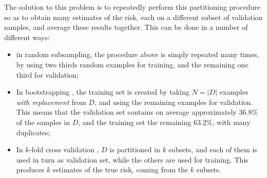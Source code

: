 \documentclass[a4paper]{book}
\begin{document}
The solution to this problem is to repeatedly perform this partitioning procedure so as to obtain many estimates of the risk, each on a different subset of validation samples, and average these results together. This can be done in a number of different ways:

\begin{itemize}
\item in random subsampling, the procedure above is simply repeated many times, by using two thirds random examples for training, and the remaining one third for validation;
\item In bootstrapping \citep{bootstrap}, the training set is created by taking $N=\vert D\vert$ examples \emph{with replacement} from $D$, and using the remaining examples for validation. This means that the validation set contains on average approximately 36.8\% of the samples in $D$, and the training set the remaining 63.2\%, with many duplicates;
\item In $k$-fold cross validation \citep{kfold}, $D$ is partitioned in $k$ subsets, and each of them is used in turn as validation set, while the others are used for training. This produces $k$ estimates of the true risk, coming from the $k$ subsets.
\end{itemize}
\end{document}
